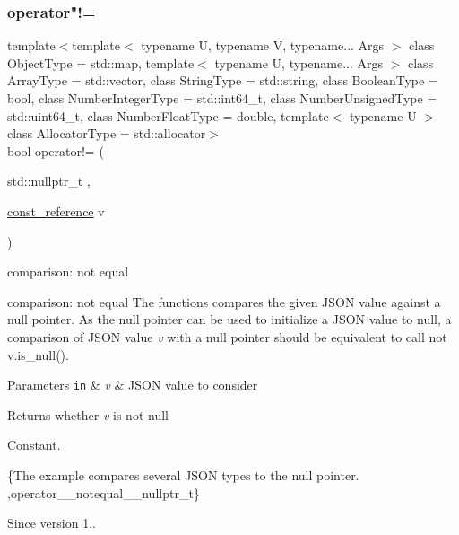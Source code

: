 \subsubsection{\texorpdfstring{operator"!=}{operator!=}\hspace{0.1cm}{\footnotesize\ttfamily [3/3]}}
{\footnotesize\ttfamily template$<$template$<$ typename U, typename V, typename... Args $>$ class Object\+Type = std\+::map, template$<$ typename U, typename... Args $>$ class Array\+Type = std\+::vector, class String\+Type  = std\+::string, class Boolean\+Type  = bool, class Number\+Integer\+Type  = std\+::int64\+\_\+t, class Number\+Unsigned\+Type  = std\+::uint64\+\_\+t, class Number\+Float\+Type  = double, template$<$ typename U $>$ class Allocator\+Type = std\+::allocator$>$ \\
bool operator!= (\begin{DoxyParamCaption}\item[{std\+::nullptr\+\_\+t}]{,  }\item[{\hyperlink{classnlohmann_1_1basic__json_af677a29b0e66edc9f66e5167e4667071}{const\+\_\+reference}}]{v }\end{DoxyParamCaption})\hspace{0.3cm}{\ttfamily [friend]}}



comparison\+: not equal 

comparison\+: not equal The functions compares the given J\+S\+ON value against a null pointer. As the null pointer can be used to initialize a J\+S\+ON value to null, a comparison of J\+S\+ON value {\itshape v} with a null pointer should be equivalent to call {\ttfamily not v.\+is\+\_\+null()}.


\begin{DoxyParams}[1]{Parameters}
\mbox{\tt in}  & {\em v} & J\+S\+ON value to consider \\
\hline
\end{DoxyParams}
\begin{DoxyReturn}{Returns}
whether {\itshape v} is not null
\end{DoxyReturn}
Constant.

\{The example compares several J\+S\+ON types to the null pointer. ,operator\+\_\+\+\_\+notequal\+\_\+\+\_\+nullptr\+\_\+t\}

\begin{DoxySince}{Since}
version 1.. 
\end{DoxySince}
\hypertarget{classnlohmann_1_1basic__json_a24d7df0b5b41319dbab2713d3641faf7}{}\label{classnlohmann_1_1basic__json_a24d7df0b5b41319dbab2713d3641faf7} 
